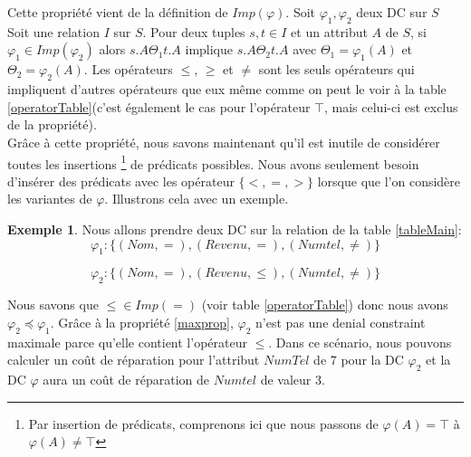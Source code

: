 \documentclass[letterpaper, 12pt]{report}
\theoremstyle{definition}
\newtheorem{myexample}{Exemple}
\begin{document}
Cette propriété vient de la définition de $Imp(\varphi)$. Soit $\varphi_1, \varphi_2$ deux DC sur $S$ Soit une relation $I$ sur $S$. Pour deux tuples $s,t \in I$ et un attribut $A$ de $S$, si $\varphi_1 \in Imp(\varphi_2)$ alors $s.A \Theta_1 t.A$ implique $s.A \Theta_2 t.A$ avec $\Theta_1 = \varphi_1(A)$ et $\Theta_2 = \varphi_2(A)$. Les opérateurs $\leq$, $\geq$ et $\neq$ sont les seuls opérateurs qui impliquent d'autres opérateurs que eux même comme on peut le voir à la table \ref{operatorTable}(c'est également le cas pour l'opérateur $\top$, mais celui-ci est exclus de la propriété).\\

Grâce à cette propriété, nous savons maintenant qu'il est inutile de considérer toutes les insertions \footnote{Par insertion de prédicats, comprenons ici que nous passons de $\varphi(A) = \top$ à $\varphi(A) \neq \top$} de prédicats possibles. Nous avons seulement besoin d'insérer des prédicats avec les opérateur $\{<,=,>\}$ lorsque que l'on considère les variantes de $\varphi$. Illustrons cela avec un exemple. 
\begin{myexample}
Nous allons prendre deux DC sur la relation de la table \ref{tableMain}:
$$ \varphi_1 : \{(Nom,=),(Revenu,=),(Numtel,\neq) \}$$

$$ \varphi_2 : \{(Nom,=),(Revenu,\leq),(Numtel,\neq) \}$$

\end{myexample}

Nous savons que $\leq \in Imp(=)$ (voir table \ref{operatorTable}) donc nous avons $\varphi_2 \preceq \varphi_1$. Grâce à la propriété \ref{maxprop}, $\varphi_2$ n'est pas une denial constraint maximale parce qu'elle contient l'opérateur $\leq$. Dans ce scénario, nous pouvons calculer un coût de réparation pour l'attribut $NumTel$ de 7 pour la DC $\varphi_2$ et la DC $\varphi$ aura un coût de réparation de $Numtel$ de valeur 3.
\end{document}
